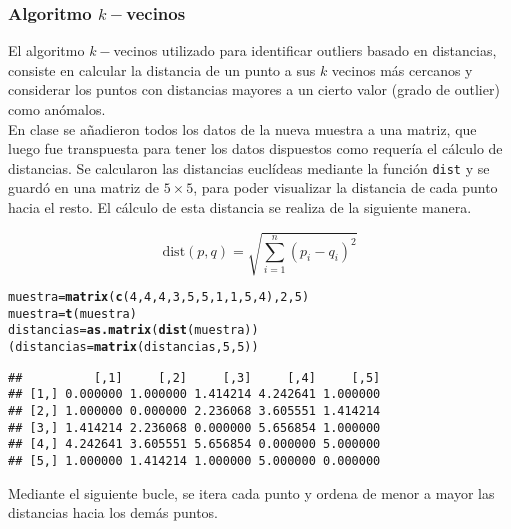 \documentclass[12pt]{report}\usepackage[]{graphicx}\usepackage[dvipsnames]{xcolor}
\makeatletter
\newcommand{\hlnum}[1]{\textcolor[rgb]{0.686,0.059,0.569}{#1}}%
\newcommand{\hlstd}[1]{\textcolor[rgb]{0.345,0.345,0.345}{#1}}%
\newcommand{\hlkwb}[1]{\textcolor[rgb]{0.69,0.353,0.396}{#1}}%
\newcommand{\hlkwd}[1]{\textcolor[rgb]{0.737,0.353,0.396}{\textbf{#1}}}%
\newenvironment{kframe}{%
 \def\at@end@of@kframe{}%
 \ifinner\ifhmode%
  \def\at@end@of@kframe{\end{minipage}}%
  \begin{minipage}{\columnwidth}%
 \fi\fi%
 \def\FrameCommand##1{\hskip\@totalleftmargin \hskip-\fboxsep
 \colorbox{shadecolor}{##1}\hskip-\fboxsep
     \hskip-\linewidth \hskip-\@totalleftmargin \hskip\columnwidth}%
 \MakeFramed {\advance\hsize-\width
   \@totalleftmargin\z@ \linewidth\hsize
   \@setminipage}}%
 {\par\unskip\endMakeFramed%
 \at@end@of@kframe}
\newenvironment{knitrout}{}{} %
\newcommand{\dt}{\text{dist}}
\makeatother
\begin{document}
				\subsubsection{Algoritmo $k-$vecinos}
				
					El algoritmo $k-$vecinos utilizado para identificar outliers basado en distancias, consiste en calcular la distancia de un punto a sus $k$ vecinos más cercanos y considerar los puntos con distancias mayores a un cierto valor (grado de outlier) como anómalos.\\
					
					En clase se añadieron todos los datos de la nueva muestra a una matriz, que luego fue transpuesta para tener los datos dispuestos como requería el cálculo de distancias. Se calcularon las distancias euclídeas mediante la función \texttt{dist} y se guardó en una matriz de $5 \times 5$, para poder visualizar la distancia de cada punto hacia el resto. El cálculo de esta distancia se realiza de la siguiente manera.
					
					$$
					\dt(p, q) = \sqrt{\sum_{i=1}^n(p_i-q_i)^2}
					$$
					
\begin{knitrout}
\color{fgcolor}\begin{kframe}
\begin{alltt}
\hlstd{muestra}\hlkwb{=}\hlkwd{matrix}\hlstd{(}\hlkwd{c}\hlstd{(}\hlnum{4}\hlstd{,}\hlnum{4}\hlstd{,}\hlnum{4}\hlstd{,}\hlnum{3}\hlstd{,}\hlnum{5}\hlstd{,}\hlnum{5}\hlstd{,}\hlnum{1}\hlstd{,}\hlnum{1}\hlstd{,}\hlnum{5}\hlstd{,}\hlnum{4}\hlstd{),}\hlnum{2}\hlstd{,}\hlnum{5}\hlstd{)}
\hlstd{muestra}\hlkwb{=}\hlkwd{t}\hlstd{(muestra)}
\hlstd{distancias}\hlkwb{=}\hlkwd{as.matrix}\hlstd{(}\hlkwd{dist}\hlstd{(muestra))}
\hlstd{(distancias}\hlkwb{=}\hlkwd{matrix}\hlstd{(distancias,}\hlnum{5}\hlstd{,}\hlnum{5}\hlstd{))}
\end{alltt}
\begin{verbatim}
##          [,1]     [,2]     [,3]     [,4]     [,5]
## [1,] 0.000000 1.000000 1.414214 4.242641 1.000000
## [2,] 1.000000 0.000000 2.236068 3.605551 1.414214
## [3,] 1.414214 2.236068 0.000000 5.656854 1.000000
## [4,] 4.242641 3.605551 5.656854 0.000000 5.000000
## [5,] 1.000000 1.414214 1.000000 5.000000 0.000000
\end{verbatim}
\end{kframe}
\end{knitrout}
					
					Mediante el siguiente bucle, se itera cada punto y ordena de menor a mayor las distancias hacia los demás puntos.
					
\end{document}
